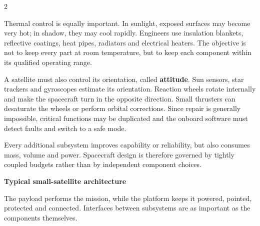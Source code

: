 \begin{multicols}{2}
\begin{ecarticle}
Thermal control is equally important. In sunlight, exposed surfaces may become very hot; in shadow, they may cool rapidly. Engineers use insulation blankets, reflective coatings, heat pipes, radiators and electrical heaters. The objective is not to keep every part at room temperature, but to keep each component within its qualified operating range.

A satellite must also control its orientation, called \textbf{attitude}. Sun sensors, star trackers and gyroscopes estimate its orientation. Reaction wheels rotate internally and make the spacecraft turn in the opposite direction. Small thrusters can desaturate the wheels or perform orbital corrections. Since repair is generally impossible, critical functions may be duplicated and the onboard software must detect faults and switch to a safe mode.
\end{ecarticle}

\begin{tcolorbox}[title=\sffamily\bfseries Engineering Insight,colback=yellow!10,colframe=ECOrange]
Every additional subsystem improves capability or reliability, but also consumes mass, volume and power. Spacecraft design is therefore governed by tightly coupled budgets rather than by independent component choices.
\end{tcolorbox}

\begin{engineeringfocus}
\textbf{Typical small-satellite architecture}
\begin{center}
\end{center}
The payload performs the mission, while the platform keeps it powered, pointed, protected and connected. Interfaces between subsystems are as important as the components themselves.
\end{engineeringfocus}


\end{multicols}
